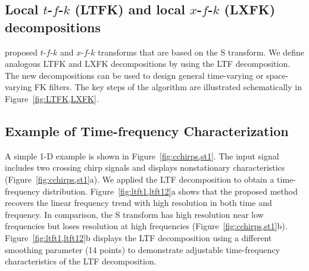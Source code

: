 \subsection{Local $t$-$f$-$k$ (LTFK) and local $x$-$f$-$k$ (LXFK) decompositions}

\cite{Askari08} proposed $t$-$f$-$k$ and $x$-$f$-$k$ transforms that 
are based on the S transform. We define analogous LTFK and LXFK
decompositions by using the LTF decomposition. The new decompositions
can be used to design general time-varying or space-varying FK
filters. The key steps of the algorithm are illustrated schematically
in Figure~\ref{fig:LTFK,LXFK}.


\subsection{Example of Time-frequency Characterization} 
A simple 1-D example is shown in Figure~\ref{fig:cchirps,st1}. The
input signal includes two crossing chirp signals and displays
nonstationary characteristics (Figure~\ref{fig:cchirps,st1}a).  We
applied the LTF decomposition to obtain a time-frequency
distribution. Figure~\ref{fig:ltft1,ltft12}a shows that the proposed
method recovers the linear frequency trend with high resolution in
both time and frequency. In comparison, the S transform has high
resolution near low frequencies but loses resolution at high
frequencies
(Figure~\ref{fig:cchirps,st1}b). Figure~\ref{fig:ltft1,ltft12}b
displays the LTF decomposition using a different smoothing parameter
(14 points) to demonstrate adjustable time-frequency characteristics
of the LTF decomposition.



